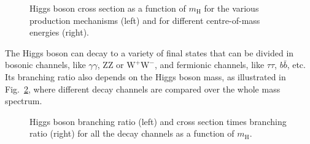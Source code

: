 \begin{figure}[htb]
\centering
{}
\caption{Higgs boson cross section as a function of $m_\mathrm{H}$ for the various production mechanisms (left) and for different centre-of-mass energies (right).}\label{fig:higgs_xsec}
\end{figure}

The Higgs boson can decay to a variety of final states that can be divided in bosonic channels, like $\gamma\gamma$, ZZ or $\mathrm{W^+W^-}$, and fermionic channels, like $\tau\tau$, $b\bar b$, etc.
Its branching ratio also depends on the Higgs boson mass, as illustrated in Fig.~\ref{fig:higgs_br}, where different decay channels are compared over the whole mass spectrum.

\begin{figure}[htb]
\centering
{}
\caption{Higgs boson branching ratio (left) and cross section times branching ratio (right) for all the decay channels as a function of $m_\mathrm{H}$.}\label{fig:higgs_br}
\end{figure}


